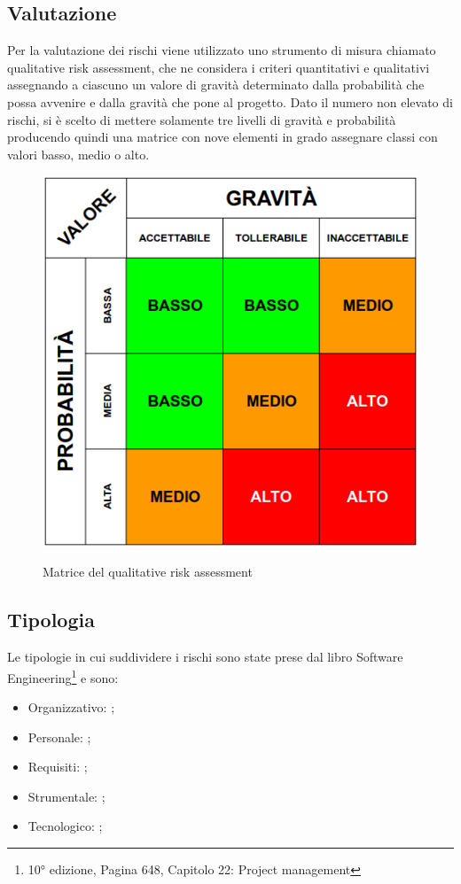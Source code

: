 	\subsection{Valutazione}
	Per la valutazione dei rischi viene utilizzato uno strumento di misura chiamato qualitative risk assessment, che ne considera i criteri quantitativi e qualitativi assegnando a ciascuno un valore di gravità determinato dalla probabilità che possa avvenire e dalla gravità che pone al progetto.
	Dato il numero non elevato di rischi, si è scelto di mettere solamente tre livelli di gravità e probabilità producendo quindi una matrice con nove elementi in grado assegnare classi con valori basso, medio o alto.
	\begin{figure}[H]
		\centering
		\includegraphics[scale=0.6]{img/risk_assessment_table.png}\\
		\caption{Matrice del qualitative risk assessment}
	\end{figure}
	\subsection{Tipologia}
	Le tipologie in cui suddividere i rischi sono state prese dal libro Software Engineering\footnote{10° edizione, Pagina 648, Capitolo 22: Project management} e sono:
	\begin{itemize}
 		\item Organizzativo: ;
		\item Personale: ;
		\item Requisiti: ;
		\item Strumentale: ;
		\item Tecnologico: ;
	\end{itemize}
